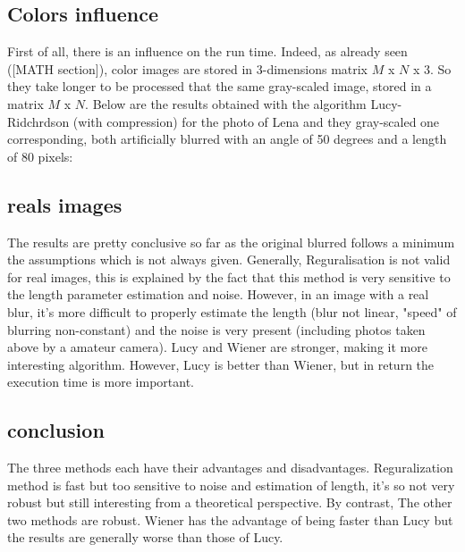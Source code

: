 \subsection{Colors influence}

First of all, there is an influence on the run time. Indeed, as already seen ([MATH section]), color images are stored in 3-dimensions matrix $M$ x $N$ x $3$. So they take longer to be processed that the same gray-scaled image, stored in a matrix $M$ x $N$.
Below are the results obtained with the algorithm Lucy-Ridchrdson (with compression) for the photo of Lena and they gray-scaled one corresponding, both artificially blurred with an angle of 50 degrees and a length of 80 pixels:


 

\subsection{reals images}

 
The results are pretty conclusive so far as the original blurred follows a minimum the assumptions which is not always given. Generally, Reguralisation is not valid for real images, this is explained by the fact that this method is very sensitive to the length parameter estimation and noise. However, in an image with a real blur, it's more difficult to properly estimate the length (blur not linear, "speed" of blurring non-constant) and the noise is very present (including photos taken above by a amateur camera). Lucy and Wiener are stronger, making it more interesting algorithm. However, Lucy is better than Wiener, but in return the execution time is more important.

\subsection{conclusion}

The three methods each have their advantages and disadvantages. Reguralization method is fast but too sensitive to noise and estimation of length, it's so not very robust but still interesting from a theoretical perspective. By contrast, The other two methods are robust. Wiener has the advantage of being faster than Lucy but the results are generally worse than those of Lucy.
